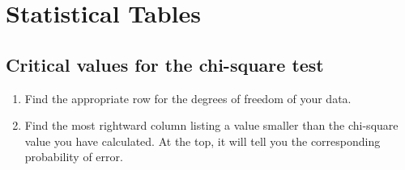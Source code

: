 \chapter{Statistical Tables}
\label{sec:statisticaltables}

\section{Critical values for the chi-square test}
\label{sec:chisquarecriticalvalues}

\begin{enumerate}
  \item Find the appropriate row for the degrees of freedom of your data.
  \item Find the most rightward column listing a value smaller than the chi-square value you have calculated. At the top, it will tell you the corresponding probability of error.
\end{enumerate}

